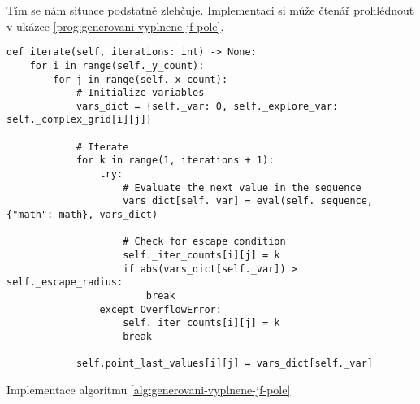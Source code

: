 Tím se nám situace podstatně zlehčuje. Implementaci si může čtenář prohlédnout v ukázce \ref{prog:generovani-vyplnene-jf-pole}.
\begin{program}[h]
\begin{lstlisting}[style=python]
def iterate(self, iterations: int) -> None:
    for i in range(self._y_count):
        for j in range(self._x_count):
            # Initialize variables
            vars_dict = {self._var: 0, self._explore_var: self._complex_grid[i][j]}

            # Iterate
            for k in range(1, iterations + 1):
                try:
                    # Evaluate the next value in the sequence
                    vars_dict[self._var] = eval(self._sequence, {"math": math}, vars_dict)

                    # Check for escape condition
                    self._iter_counts[i][j] = k
                    if abs(vars_dict[self._var]) > self._escape_radius:
                        break
                except OverflowError:
                    self._iter_counts[i][j] = k
                    break
            
            self.point_last_values[i][j] = vars_dict[self._var]
\end{lstlisting}
    \caption{Implementace algoritmu \ref{alg:generovani-vyplnene-jf-pole}}
    \label{prog:generovani-vyplnene-jf-pole}
\end{program}